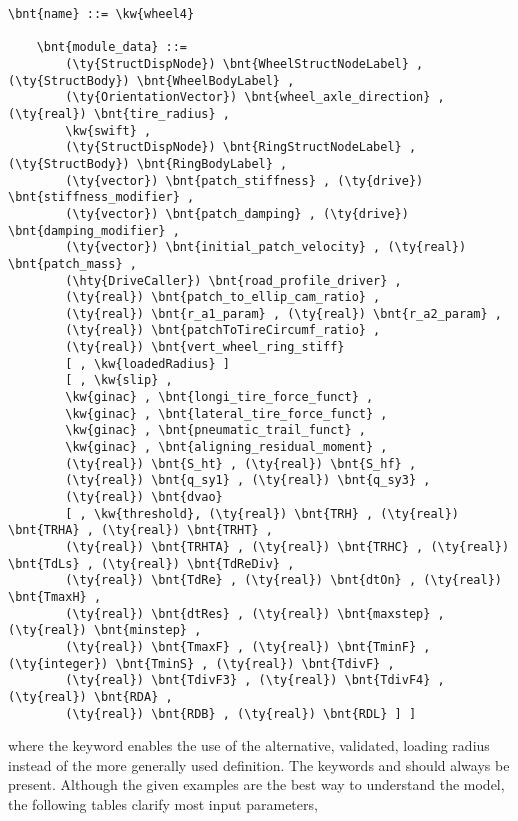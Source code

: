 \begin{Verbatim}[commandchars=\\\{\}]
    \bnt{name} ::= \kw{wheel4}

    \bnt{module_data} ::=
        (\ty{StructDispNode}) \bnt{WheelStructNodeLabel} , (\ty{StructBody}) \bnt{WheelBodyLabel} ,
        (\ty{OrientationVector}) \bnt{wheel_axle_direction} , (\ty{real}) \bnt{tire_radius} ,
        \kw{swift} ,
        (\ty{StructDispNode}) \bnt{RingStructNodeLabel} , (\ty{StructBody}) \bnt{RingBodyLabel} ,
        (\ty{vector}) \bnt{patch_stiffness} , (\ty{drive}) \bnt{stiffness_modifier} ,
        (\ty{vector}) \bnt{patch_damping} , (\ty{drive}) \bnt{damping_modifier} ,
        (\ty{vector}) \bnt{initial_patch_velocity} , (\ty{real}) \bnt{patch_mass} ,
        (\hty{DriveCaller}) \bnt{road_profile_driver} ,
        (\ty{real}) \bnt{patch_to_ellip_cam_ratio} ,
        (\ty{real}) \bnt{r_a1_param} , (\ty{real}) \bnt{r_a2_param} ,
        (\ty{real}) \bnt{patchToTireCircumf_ratio} ,
        (\ty{real}) \bnt{vert_wheel_ring_stiff}
        [ , \kw{loadedRadius} ]
        [ , \kw{slip} ,
        \kw{ginac} , \bnt{longi_tire_force_funct} ,
        \kw{ginac} , \bnt{lateral_tire_force_funct} ,
        \kw{ginac} , \bnt{pneumatic_trail_funct} ,
        \kw{ginac} , \bnt{aligning_residual_moment} ,
        (\ty{real}) \bnt{S_ht} , (\ty{real}) \bnt{S_hf} ,
        (\ty{real}) \bnt{q_sy1} , (\ty{real}) \bnt{q_sy3} ,
        (\ty{real}) \bnt{dvao}
        [ , \kw{threshold}, (\ty{real}) \bnt{TRH} , (\ty{real}) \bnt{TRHA} , (\ty{real}) \bnt{TRHT} , 
        (\ty{real}) \bnt{TRHTA} , (\ty{real}) \bnt{TRHC} , (\ty{real}) \bnt{TdLs} , (\ty{real}) \bnt{TdReDiv} ,
        (\ty{real}) \bnt{TdRe} , (\ty{real}) \bnt{dtOn} , (\ty{real}) \bnt{TmaxH} , 
        (\ty{real}) \bnt{dtRes} , (\ty{real}) \bnt{maxstep} , (\ty{real}) \bnt{minstep} , 
        (\ty{real}) \bnt{TmaxF} , (\ty{real}) \bnt{TminF} , (\ty{integer}) \bnt{TminS} , (\ty{real}) \bnt{TdivF} ,
        (\ty{real}) \bnt{TdivF3} , (\ty{real}) \bnt{TdivF4} , (\ty{real}) \bnt{RDA} , 
        (\ty{real}) \bnt{RDB} , (\ty{real}) \bnt{RDL} ] ]
\end{Verbatim}
where the keyword  enables the use of the alternative, validated, loading radius instead of the more generally used definition. The keywords  and  should always be present. Although the given examples are the best way to understand the model, the following tables clarify most input parameters,



